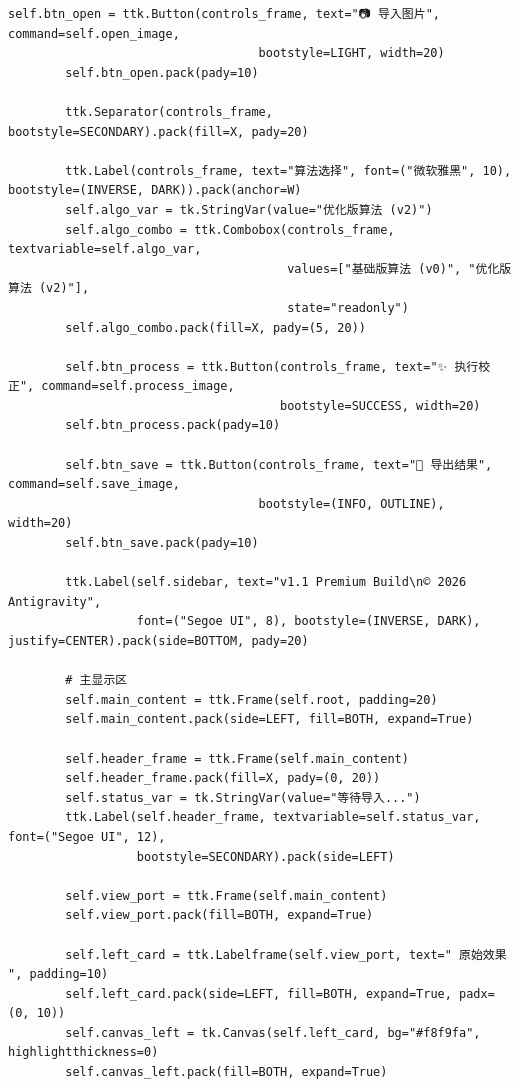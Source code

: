 \documentclass[12pt,a4paper,UTF8]{ctexart} %
\begin{document}
\begin{lstlisting}[caption={AWB可视化GUI代码（awb\_gui.py）}, label=code:gui]
        self.btn_open = ttk.Button(controls_frame, text="📷 导入图片", command=self.open_image, 
                                   bootstyle=LIGHT, width=20)
        self.btn_open.pack(pady=10)
        
        ttk.Separator(controls_frame, bootstyle=SECONDARY).pack(fill=X, pady=20)
        
        ttk.Label(controls_frame, text="算法选择", font=("微软雅黑", 10), bootstyle=(INVERSE, DARK)).pack(anchor=W)
        self.algo_var = tk.StringVar(value="优化版算法 (v2)")
        self.algo_combo = ttk.Combobox(controls_frame, textvariable=self.algo_var, 
                                       values=["基础版算法 (v0)", "优化版算法 (v2)"],
                                       state="readonly")
        self.algo_combo.pack(fill=X, pady=(5, 20))
        
        self.btn_process = ttk.Button(controls_frame, text="✨ 执行校正", command=self.process_image, 
                                      bootstyle=SUCCESS, width=20)
        self.btn_process.pack(pady=10)
        
        self.btn_save = ttk.Button(controls_frame, text="💾 导出结果", command=self.save_image, 
                                   bootstyle=(INFO, OUTLINE), width=20)
        self.btn_save.pack(pady=10)
        
        ttk.Label(self.sidebar, text="v1.1 Premium Build\n© 2026 Antigravity", 
                  font=("Segoe UI", 8), bootstyle=(INVERSE, DARK), justify=CENTER).pack(side=BOTTOM, pady=20)
        
        # 主显示区
        self.main_content = ttk.Frame(self.root, padding=20)
        self.main_content.pack(side=LEFT, fill=BOTH, expand=True)
        
        self.header_frame = ttk.Frame(self.main_content)
        self.header_frame.pack(fill=X, pady=(0, 20))
        self.status_var = tk.StringVar(value="等待导入...")
        ttk.Label(self.header_frame, textvariable=self.status_var, font=("Segoe UI", 12), 
                  bootstyle=SECONDARY).pack(side=LEFT)
        
        self.view_port = ttk.Frame(self.main_content)
        self.view_port.pack(fill=BOTH, expand=True)
        
        self.left_card = ttk.Labelframe(self.view_port, text=" 原始效果 ", padding=10)
        self.left_card.pack(side=LEFT, fill=BOTH, expand=True, padx=(0, 10))
        self.canvas_left = tk.Canvas(self.left_card, bg="#f8f9fa", highlightthickness=0)
        self.canvas_left.pack(fill=BOTH, expand=True)
        

\end{lstlisting}
\end{document}
